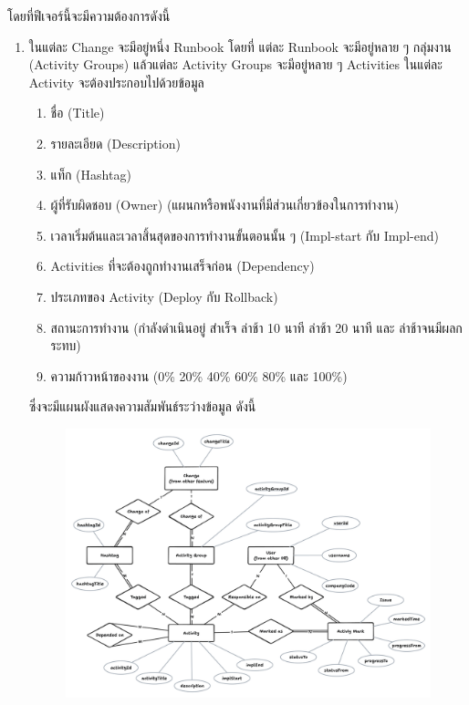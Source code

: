 โดยที่ฟีเจอร์นี้จะมีความต้องการดังนี้
\begin{enumerate}
    \item ในแต่ละ Change จะมีอยู่หนึ่ง Runbook โดยที่ แต่ละ Runbook จะมีอยู่หลาย ๆ กลุ่มงาน (Activity Groups) แล้วแต่ละ Activity Groups จะมีอยู่หลาย ๆ Activities ในแต่ละ Activity จะต้องประกอบไปด้วยข้อมูล 
    \begin{enumerate}
        \item ชื่อ (Title)
        \item รายละเอียด (Description) 
        \item แท็ก (Hashtag)
        \item ผู้ที่รับผิดชอบ (Owner) (แผนกหรือพนังงานที่มีส่วนเกี่ยวข้องในการทำงาน)
        \item เวลาเริ่มต้นและเวลาสิ้นสุดของการทำงานขั้นตอนนั้น ๆ (Impl-start กับ Impl-end)
        \item Activities ที่จะต้องถูกทำงานเสร็จก่อน (Dependency)
        \item ประเภทของ Activity (Deploy กับ Rollback)
        \item สถานะการทำงาน (กำลังดำเนินอยู่ สำเร็จ ล่าช้า 10 นาที ล่าช้า 20 นาที และ ล่าช้าจนมีผลกระทบ)
        \item ความก้าวหน้าของงาน (0\% 20\% 40\% 60\% 80\% และ 100\%)
    \end{enumerate}
    ซึ่งจะมีแผนผังแสดงความสัมพันธ์ระว่างข้อมูล ดังนี้
    \begin{figure}[H]
        \begin{center}
            \includegraphics[scale=0.2]{resources/change-runbook-er.png}
        \end{center}

\end{figure}
\end{enumerate}
